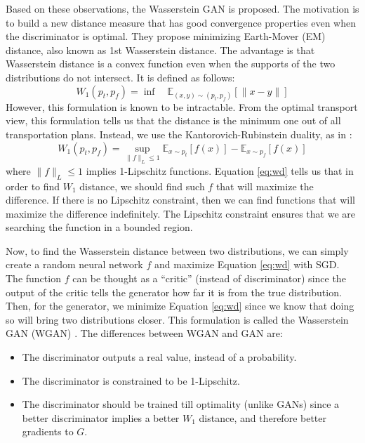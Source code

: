 \documentclass[a4paper,onesided,12pt]{report}
\begin{document}
Based on these observations, the Wasserstein GAN \cite{arjovsky2017wasserstein} is proposed. The motivation is to build a new distance measure that has good convergence properties even when the discriminator is optimal. They propose minimizing Earth-Mover (EM) distance, also known as 1st Wasserstein distance. The advantage is that Wasserstein distance is a convex function even when the supports of the two distributions do not intersect. It is defined as follows:
\begin{equation}
W_1(p_t, p_f) = \inf \quad \mathbb{E}_{(x,y) \sim (p_t, p_f)} [ \| x-y \| ]
\label{eq:emd}
\end{equation}
However, this formulation is known to be intractable. From the optimal transport view, this formulation tells us that the distance is the minimum one out of all transportation plans. Instead, we use the Kantorovich-Rubinstein duality, as in \cite{arjovsky2017wasserstein}:
\begin{equation}
W_1(p_t, p_f) = \underset{\|f\|_L \leq 1}{\sup} \mathbb{E}_{x\sim p_t} [f(x)] - \mathbb{E}_{x \sim p_f} [f(x)]
\label{eq:wd}
\end{equation}
where $\|f\|_L \leq 1$ implies 1-Lipschitz functions. Equation \ref{eq:wd} tells us that in order to find $W_1$ distance, we should find such $f$ that will maximize the difference. If there is no Lipschitz constraint, then we can find functions that will maximize the difference indefinitely. The Lipschitz constraint ensures that we are searching the function in a bounded region.

Now, to find the Wasserstein distance between two distributions, we can simply create a random neural network $f$ and maximize Equation \ref{eq:wd} with SGD. The function $f$ can be thought as a ``critic'' (instead of discriminator) since the output of the critic tells the generator how far it is from the true distribution. Then, for the generator, we minimize Equation \ref{eq:wd} since we know that doing so will bring two distributions closer. This formulation is called the Wasserstein GAN (WGAN) \cite{arjovsky2017wasserstein}.  The differences between WGAN and GAN are:
\begin{itemize}
	\item The discriminator outputs a real value, instead of a probability.
	\item The discriminator is constrained to be 1-Lipschitz.
	\item The discriminator should be trained till optimality (unlike GANs) since a better discriminator implies a better $W_1$ distance, and therefore better gradients to $G$.
\end{itemize}
\end{document}
